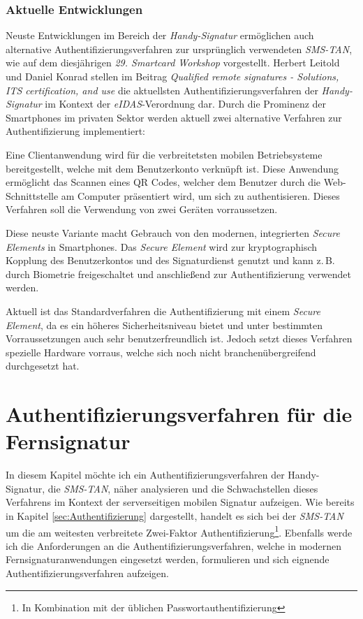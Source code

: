 \documentclass[11pt,a4paper,ngerman]{scrreprt}
\begin{document}
\subsection{Aktuelle Entwicklungen}\label{sec:scWorkshop}
Neuste Entwicklungen im Bereich der \textit{Handy-Signatur} ermöglichen auch alternative Authentifizierungsverfahren zur ursprünglich verwendeten \textit{SMS-TAN}, wie auf dem diesjährigen \textit{29. Smartcard Workshop} vorgestellt. Herbert Leitold und Daniel Konrad stellen im Beitrag \textit{Qualified remote signatures - Solutions, ITS certification, and use} \cite{scWorkshop} die aktuellsten Authentifizierungsverfahren der \textit{Handy-Signatur} im Kontext der \textit{eIDAS}-Verordnung dar. Durch die Prominenz der Smartphones im privaten Sektor werden aktuell zwei alternative Verfahren zur Authentifizierung implementiert:
\begin{description}[font=\rmfamily]
    \item[OTP mit QR Code:] Eine Clientanwendung wird für die verbreitetsten mobilen Betriebsysteme bereitgestellt, welche mit dem Benutzerkonto verknüpft ist. Diese Anwendung ermöglicht das Scannen eines QR Codes, welcher dem Benutzer durch die Web-Schnittstelle am Computer präsentiert wird, um sich zu authentisieren. Dieses Verfahren soll die Verwendung von zwei Geräten vorraussetzen.
    \item[Secure Hardware Element (SE):] Diese neuste Variante macht Gebrauch von den modernen, integrierten \textit{Secure Elements} in Smartphones. Das \textit{Secure Element} wird zur kryptographisch Kopplung des Benutzerkontos und des Signaturdienst genutzt und kann z.\,B. durch Biometrie freigeschaltet und anschließend zur Authentifizierung verwendet werden.
\end{description}
Aktuell ist das Standardverfahren die Authentifizierung mit einem \textit{Secure Element}, da es ein höheres Sicherheitsniveau bietet und unter bestimmten Vorraussetzungen auch sehr benutzerfreundlich ist. Jedoch setzt dieses Verfahren spezielle Hardware vorraus, welche sich noch nicht branchenübergreifend durchgesetzt hat.

\chapter{Authentifizierungsverfahren für die Fernsignatur}
In diesem Kapitel möchte ich ein Authentifizierungsverfahren der Handy-Signatur, die \textit{SMS-TAN}, näher analysieren und die Schwachstellen dieses Verfahrens im Kontext der serverseitigen mobilen Signatur aufzeigen. Wie bereits in Kapitel \ref{sec:Authentifizierung} dargestellt, handelt es sich bei der \textit{SMS-TAN} um die am weitesten verbreitete Zwei-Faktor Authentifizierung\footnote{In Kombination mit der üblichen Passwortauthentifizierung}. Ebenfalls werde ich die Anforderungen an die Authentifizierungsverfahren, welche in modernen Fernsignaturanwendungen eingesetzt werden, formulieren und sich eignende Authentifizierungsverfahren aufzeigen.
\end{document}
